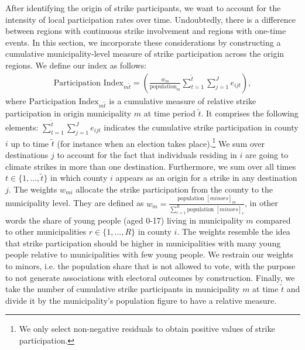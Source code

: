 After identifying the origin of strike participants, we want to account for the intensity of local participation rates over time. Undoubtedly, there is a difference between regions with continuous strike involvement and regions with one-time events. In this section, we incorporate these considerations by constructing a cumulative municipality-level measure of strike participation across the origin regions. We define our index as follows:
\begin{align}
	\text{Participation Index}_{m\tilde{t}} = \left( \frac{w_{m}}{\text{population}_{m}} \sum\limits_{t=1}^{\tilde{t}}\sum\limits_{j=1}^{J} e_{ijt}\right), \label{eq_greta_cons:participation_index}
\end{align}
where $\text{Participation Index}_{m\tilde{t}}$ is a cumulative measure of relative strike participation in origin municipality $m$ at time period $\tilde{t}$. It comprises the following elements: $\sum_{t=1}^{\tilde{t}}\sum_{j=1}^{J} e_{ijt}$ indicates the cumulative strike participation in county $i$ up to time $\tilde{t}$ (for instance when an election takes place).\footnote{We only select non-negative residuals to obtain positive values of strike participation.} We sum over destinations $j$ to account for the fact that individuals residing in $i$ are going to climate strikes in more than one destination. Furthermore, we sum over all times $t\in\{1,...,\tilde{t}\}$ in which county $i$ appears as an origin for a strike in any destination $j$. The weights $w_{mi}$ allocate the strike participation from the county to the municipality level. They are defined as $w_m=\tfrac{\text{population }[minors]_m}{\sum_{r=1}^{R}\text{population }[minors]_r}$, in other words the share of young people (aged 0-17) living in municipality $m$ compared to other municipalities $r\in\{1,...,R\}$ in county $i$. The weights resemble the idea that strike participation should be higher in municipalities with many young people relative to municipalities with few young people. We restrain our weights to minors, i.e. the population share that is not allowed to vote, with the purpose to not generate associations with electoral outcomes by construction. Finally, we take the number of cumulative strike participants in municipality $m$ at time $\tilde{t}$ and divide it by the municipality's population figure to have a relative measure.

















